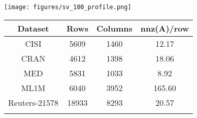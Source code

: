\begin{center}
\begin{minipage}[b]{0.4\textwidth}
  \centering
  \texttt{[image: figures/sv\_100\_profile.png]}
  \label{fig:sv}
\end{minipage}
\hfill
\begin{minipage}[b]{0.58\textwidth}
  \centering
  \begin{tabular}{cccc}
    \toprule
    Dataset       & Rows  & Columns & nnz(A)/row \\
    \midrule
    CISI \cite{LSISite}                                     & 5609  &    1460 &      12.17 \\
    CRAN \cite{LSISite}                                     & 4612  &    1398 &      18.06 \\
    MED  \cite{LSISite}                                     & 5831  &    1033 &       8.92 \\
    ML1M \cite{Harper2015}                                  & 6040  &    3952 &     165.60 \\
    Reuters-21578 \cite{Cai2005, Cai2007, Cai2008, Cai2009} & 18933 &    8293 &      20.57 \\
    \bottomrule
    \vspace{5mm}
  \end{tabular}
  \\
  \label{table:datasets}
\end{minipage}
\end{center}